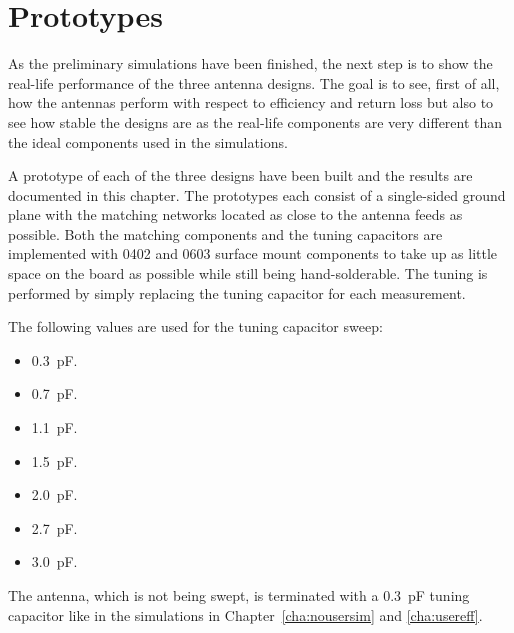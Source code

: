 \chapter{Prototypes}
\label{cha:prototypes}

As the preliminary simulations have been finished, the next step is to show the real-life performance of the three antenna designs. The goal is to see, first of all, how the antennas perform with respect to efficiency and return loss but also to see how stable the designs are as the real-life components are very different than the ideal components used in the simulations.

A prototype of each of the three designs have been built and the results are documented in this chapter. The prototypes each consist of a single-sided ground plane with the matching networks located as close to the antenna feeds as possible. Both the matching components and the tuning capacitors are implemented with 0402 and 0603 surface mount components to take up as little space on the board as possible while still being hand-solderable. The tuning is performed by simply replacing the tuning capacitor for each measurement.

The following values are used for the tuning capacitor sweep:
\begin{itemize}
\item \SI{0.3}{pF}.
\item \SI{0.7}{pF}.
\item \SI{1.1}{pF}.
\item \SI{1.5}{pF}.
\item \SI{2.0}{pF}.
\item \SI{2.7}{pF}.
\item \SI{3.0}{pF}.
\end{itemize}
The antenna, which is not being swept, is terminated with a \SI{0.3}{pF} tuning capacitor like in the simulations in Chapter~\ref{cha:nousersim} and \ref{cha:usereff}.
